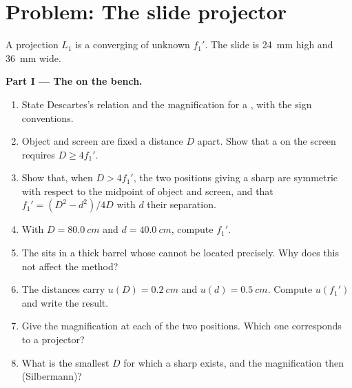 \section{Problem: The slide projector}

\begin{problem}
\label{pb:b1:mirrors-thin-lenses:1}
A projection  $L_1$ is a converging  of unknown  $f_1'$. The slide is \qty{24}{mm} high and \qty{36}{mm} wide.

\medskip
\noindent\textbf{Part I --- The  on the bench.}
\begin{enumerate}
  \item State Descartes's relation and the magnification for a , with the sign conventions.
  \item Object and screen are fixed a distance $D$ apart. Show that a
         on the screen requires $D \geq 4f_1'$.
  \item Show that, when $D > 4f_1'$, the two  positions giving a
        sharp  are symmetric with respect to the midpoint of
        object and screen, and that $f_1' = (D^2 - d^2)/4D$ with $d$
        their separation.
  \item With $D = \qty{80.0}{cm}$ and $d = \qty{40.0}{cm}$, compute
        $f_1'$.
  \item The  sits in a thick barrel whose  cannot be
        located precisely. Why does this not affect the method?
  \item The distances carry $u(D) = \qty{0.2}{cm}$ and
        $u(d) = \qty{0.5}{cm}$. Compute $u(f_1')$ and write the result.
  \item Give the magnification at each of the two positions. Which one
        corresponds to a projector?
  \item What is the smallest $D$ for which a sharp  exists, and
        the magnification then (Silbermann)?
\end{enumerate}


\end{problem}
